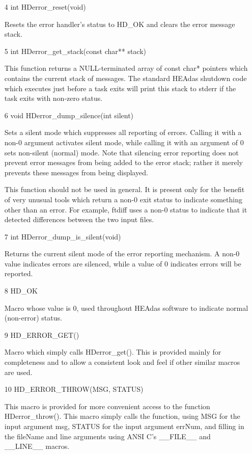 \documentclass[11pt]{book}
\begin{document}
\begin{itemize}
\item[4] int HDerror\_reset(void)

Resets the error handler's status to HD\_OK and clears the error
message stack.

\item[5] int HDerror\_get\_stack(const char** stack)

This function returns a NULL-terminated array of const char*
pointers which contains the current stack of messages. The
standard HEAdas shutdown code which executes just before
a task exits will print this stack to stderr if the task
exits with non-zero status.

\item[6] void HDerror\_dump\_silence(int silent)

Sets a silent mode which suppresses all reporting of
errors. Calling it with a non-0 argument activates silent
mode, while calling it with an argument of 0 sets non-silent
(normal) mode. Note that silencing error reporting does not
prevent error messages from being added to the error stack;
rather it merely prevents these messages from being displayed.

This function should not be used in general. It is present
only for the benefit of very unusual tools which return
a non-0 exit status to indicate something other than an
error. For example, ftdiff uses a non-0 status to
indicate that it detected differences between the two
input files.

\item[7] int HDerror\_dump\_is\_silent(void)

Returns the current silent mode of the error reporting
mechanism. A non-0 value indicates errors are silenced,
while a value of 0 indicates errors will be reported.

\item[8] HD\_OK

Macro whose value is 0, used throughout HEAdas software
to indicate normal (non-error) status.

\item[9] HD\_ERROR\_GET()

Macro which simply calls HDerror\_get(). This is provided
mainly for completeness and to allow a consistent look and
feel if other similar macros are used.

\item[10] HD\_ERROR\_THROW(MSG, STATUS)

This macro is provided for more convenient access to the function
HDerror\_throw(). This macro simply calls the function, using
MSG for the input argument msg, STATUS for the input argument
errNum, and filling in the fileName and line arguments using
ANSI C's \_\_FILE\_\_ and \_\_LINE\_\_ macros.


\end{itemize}
\end{document}
